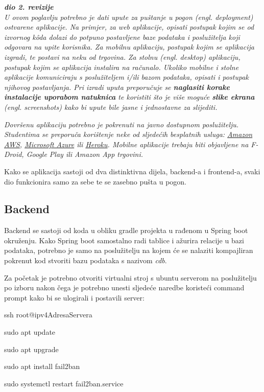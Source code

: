 			\textbf{\textit{dio 2. revizije}}\\
		
			 \textit{U ovom poglavlju potrebno je dati upute za puštanje u pogon (engl. deployment) ostvarene aplikacije. Na primjer, za web aplikacije, opisati postupak kojim se od izvornog kôda dolazi do potpuno postavljene baze podataka i poslužitelja koji odgovara na upite korisnika. Za mobilnu aplikaciju, postupak kojim se aplikacija izgradi, te postavi na neku od trgovina. Za stolnu (engl. desktop) aplikaciju, postupak kojim se aplikacija instalira na računalo. Ukoliko mobilne i stolne aplikacije komuniciraju s poslužiteljem i/ili bazom podataka, opisati i postupak njihovog postavljanja. Pri izradi uputa preporučuje se \textbf{naglasiti korake instalacije uporabom natuknica} te koristiti što je više moguće \textbf{slike ekrana} (engl. screenshots) kako bi upute bile jasne i jednostavne za slijediti.}
			
			
			 \textit{Dovršenu aplikaciju potrebno je pokrenuti na javno dostupnom poslužitelju. Studentima se preporuča korištenje neke od sljedećih besplatnih usluga: \href{https://aws.amazon.com/}{Amazon AWS}, \href{https://azure.microsoft.com/en-us/}{Microsoft Azure} ili \href{https://www.heroku.com/}{Heroku}. Mobilne aplikacije trebaju biti objavljene na F-Droid, Google Play ili Amazon App trgovini.}

            {Kako se aplikacija sastoji od dva distinktivna dijela, backend-a i frontend-a, svaki dio funkcionira samo za sebe te se zasebno pušta u pogon.}

			\subsection{Backend}

                {Backend se sastoji od koda u obliku gradle projekta u rađenom u Spring boot okruženju. Kako Spring boot samostalno radi tablice i ažurira relacije u bazi podataka, potrebno je samo na poslužitelju na kojem će se nalaziti kompajliran pokrenut kod stvoriti bazu podataka s nazivom \textit{cdb}.}
                
                {Za početak je potrebno otvoriti virtualni stroj s ubuntu serverom na poslužitelju po izboru nakon čega je potrebno unesti sljedeće naredbe koristeći command prompt kako bi se ulogirali i postavili server:}

                \begin{packed_item}
        			\item {ssh root@ipv4AdresaServera}
        			\item {sudo apt update}
        			\item {sudo apt upgrade}
        			\item {sudo apt install fail2ban}
        			\item {sudo systemctl restart fail2ban.service}
        		\end{packed_item}

